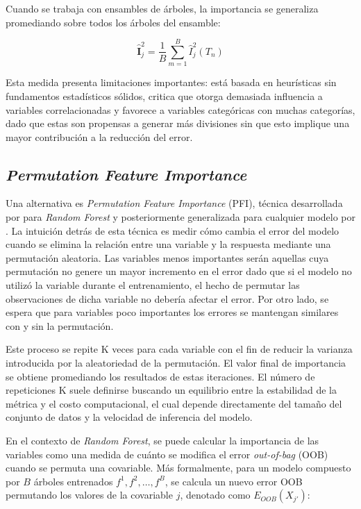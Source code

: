 Cuando se trabaja con ensambles de árboles, la importancia se generaliza promediando sobre todos los árboles del ensamble:

\begin{equation}
\hat{\mathbf{I}}_j^{2}=\frac{1}{B}\sum_{m=1}^{B}\hat{I}^{2}_j(T_n)    
\end{equation}

Esta medida presenta limitaciones importantes: está basada en heurísticas sin fundamentos estadísticos sólidos, \cite{strobl_2008} critica que otorga demasiada influencia a variables correlacionadas y favorece a variables categóricas con muchas categorías, dado que estas son propensas a generar más divisiones sin que esto implique una mayor contribución a la reducción del error.

\subsection{\textit{Permutation Feature Importance}} 

Una alternativa es \textit{Permutation Feature Importance} (PFI), técnica desarrollada por \cite{breiman2001a} para \textit{Random Forest} y posteriormente generalizada para cualquier modelo por \cite{fischer_2019}. La intuición detrás de esta técnica es medir cómo cambia el error del modelo cuando se elimina la relación entre una variable y la respuesta mediante una permutación aleatoria. Las variables menos importantes serán aquellas cuya permutación no genere un mayor incremento en el error dado que si el modelo no utilizó la variable durante el entrenamiento, el hecho de permutar las observaciones de dicha variable no debería afectar el error. Por otro lado, se espera que para variables poco importantes los errores se mantengan similares con y sin la permutación.

Este proceso se repite K veces para cada variable con el fin de reducir la varianza introducida por la aleatoriedad de la permutación. El valor final de importancia se obtiene promediando los resultados de estas iteraciones. El número de repeticiones K suele definirse buscando un equilibrio entre la estabilidad de la métrica y el costo computacional, el cual depende directamente del tamaño del conjunto de datos y la velocidad de inferencia del modelo.

En el contexto de \textit{Random Forest}, se puede calcular la importancia de las variables como una medida de cuánto se modifica el error \textit{out-of-bag} (OOB) cuando se permuta una covariable. Más formalmente, para un modelo compuesto por $B$ árboles entrenados $f^1, f^2, \dots, f^B$, se calcula un nuevo error OOB permutando los valores de la covariable $j$, denotado como $E_{OOB}(X_{j'})$:


